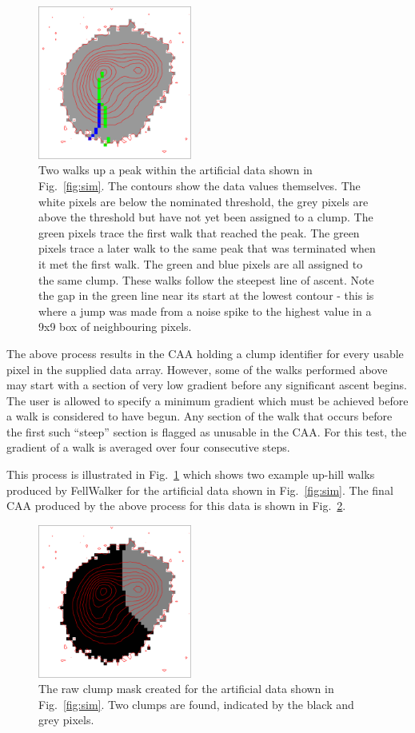 \documentclass[final,authoryear,5p,times,twocolumn]{elsarticle}
\begin{document}
\begin{figure}
\includegraphics[width=0.45\textwidth]{walks.pdf}
\caption{Two walks up a peak within the artificial data shown in
Fig.~\ref{fig:sim}. The contours show
the data values themselves. The white pixels are below the nominated threshold,
the grey pixels are above the threshold but have not yet been assigned to a
clump. The green pixels trace the first walk that reached the peak. The
green pixels trace a later walk to the same peak that was terminated when it
met the first walk. The green and blue pixels are all assigned to the same
clump. These walks follow the steepest line of ascent. Note
the gap in the green line near its start at the lowest contour - this is
where a jump was made from a noise spike to the highest value in a 9x9 box of
neighbouring pixels.}
\label{fig:walks}
\end{figure}

The above process results in the CAA holding a clump identifier for every
usable pixel in the supplied data array. However, some of the walks
performed above may start with a section of very low gradient before any
significant ascent begins. The user is allowed to specify a minimum
gradient which must be achieved before a walk is considered to have
begun. Any section of the walk that occurs before the first such
``steep'' section is flagged as unusable in the CAA. For this test,
the gradient of a walk is averaged over four consecutive steps.

This process is illustrated in Fig.~\ref{fig:walks} which shows two
example up-hill walks produced by FellWalker for the artificial data shown
in Fig.~\ref{fig:sim}. The final CAA produced by the above process for
this data is shown in Fig.~\ref{fig:rawmask}.

\begin{figure}
\includegraphics[width=0.45\textwidth]{rawmask.pdf}
\caption{The raw clump mask created for the artificial data shown in
Fig.~\ref{fig:sim}. Two clumps are found, indicated by the black and grey
pixels.}
\label{fig:rawmask}
\end{figure}
\end{document}
